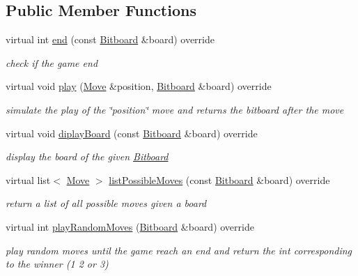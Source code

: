 \subsection*{Public Member Functions}
\begin{DoxyCompactItemize}
\item 
virtual int \hyperlink{class_tic_tac_toe_aae44f2f688f283dfbf8242e162f27395}{end} (const \hyperlink{class_bitboard}{Bitboard} \&board) override
\begin{DoxyCompactList}\small\item\em check if the game end \end{DoxyCompactList}\item 
virtual void \hyperlink{class_tic_tac_toe_a28e96db9801000c63dd48099a3ce338b}{play} (\hyperlink{class_move}{Move} \&position, \hyperlink{class_bitboard}{Bitboard} \&board) override
\begin{DoxyCompactList}\small\item\em simulate the play of the \char`\"{}position\char`\"{} move and returns the bitboard after the move \end{DoxyCompactList}\item 
virtual void \hyperlink{class_tic_tac_toe_af01dee0e29853d8abc30a6a2818a844e}{diplay\+Board} (const \hyperlink{class_bitboard}{Bitboard} \&board) override
\begin{DoxyCompactList}\small\item\em display the board of the given \hyperlink{class_bitboard}{Bitboard} \end{DoxyCompactList}\item 
virtual list$<$ \hyperlink{class_move}{Move} $>$ \hyperlink{class_tic_tac_toe_a591b5fc3b4543f3f9b6d007be5c6290e}{list\+Possible\+Moves} (const \hyperlink{class_bitboard}{Bitboard} \&board) override
\begin{DoxyCompactList}\small\item\em return a list of all possible moves given a board \end{DoxyCompactList}\item 
virtual int \hyperlink{class_tic_tac_toe_a485bf2fd5cc0dd3e6da794218d40e759}{play\+Random\+Moves} (\hyperlink{class_bitboard}{Bitboard} \&board) override
\begin{DoxyCompactList}\small\item\em play random moves until the game reach an end and return the int corresponding to the winner (1 2 or 3) \end{DoxyCompactList}\end{DoxyCompactItemize}


